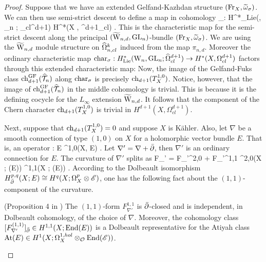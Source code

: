 \documentclass[10pt]{amsart}
\begin{document}
\begin{proof}
Suppose that we have an extended Gelfand-Kazhdan structure $({\rm Fr}_X, \widetilde{\omega}_\sigma)$.
We can then use semi-strict descent to define a map in cohomology
\ben
{}_\sigma : H^*_{\rm Lie}(\TVectd, \GL_n ; \hOmega_{cl}^{d+1}) \to H^*(X , \Omega^{d+1}_{cl}) .
\een
This is the characteristic map for the semi-strict descent along the principal $(\widetilde{\rm W}_{n,d},{\rm GL}_n)$-bundle $({\rm Fr}_X , \widetilde{\omega}_\sigma)$.
We are using the $\widetilde{\rm W}_{n,d}$ module structure on $\widehat{\Omega}^k_{n,cl}$ induced from the map $\pi_{n,d}$. 
Moreover the ordinary characteristic map ${\rm char}_\sigma : H^*_{\rm Lie}({{\rm W}_n}, {\rm GL}_n ; \widehat{\Omega}_{cl}^{d+1}) \to H^*(X , \Omega^{d+1}_{cl})$ factors through this extended characteristic map:
\ben
{}
\een
Now, the image of the Gelfand-Fuks class ${\rm ch}_{d+1}^{{\rm GF}} (\widehat{\mathcal T}_n)$ along ${\rm char}_\sigma$ is precisely ${\rm ch}_{d+1}(T_X^{1,0})$. 
Notice, however, that the image of ${\rm ch}_{d+1}^{\rm GF}(\widehat{\mathcal T}_n)$ in the middle cohomology is trivial.
This is because it is the defining cocycle for the $L_\infty$ extension $\widetilde{\rm W}_{n,d}$. 
It follows that the component of the Chern character ${\rm ch}_{d+1}(T_X^{1,0})$ is trivial in $H^{d+1}(X, \Omega^{d+1}_{cl})$. 

Next, suppose that ${\rm ch}_{d+1}(T_X^{1,0}) = 0$ and suppose $X$ is K\"ahler.
Also, let $\nabla$ be a smooth connection of type $(1,0)$ on $X$ for a
holomorphic vector bundle $E$. 
That is, an operator
\ben
\nabla : E \to \Omega^{1,0}(X, E) .
\een
Let $\nabla ' = \nabla + \Bar{\partial}$, then $\nabla'$ is an ordinary
connection for $E$. The curvature of $\nabla '$ splits as
\ben
F_{\nabla'} = F_{\nabla '}^{2,0} + F_{\nabla '}^{1,1} \in \Omega^{2,0}(X
; \End(E)) \oplus \Omega^{1,1}(X ; \End(E)) .
\een 
According to the Dolbeault isomorphism 
$H^{p,q}_{\Bar{\partial}} (X ; E) \cong H^q(X ;  \Omega^p_X \otimes \mathscr E)$, 
one has the following fact about the $(1,1)$-component of the curvature. 

\begin{prop} (Proposition 4 in \cite{atiyah})
The $(1,1)$-form $F_{\nabla'}^{1,1}$ is $\Bar{\partial}$-closed  and is independent, in Dolbeault cohomology, of the choice of $\nabla$. 
Moreover, the cohomology class $[F_{\nabla'}^{(1,1)}]_{\Bar{\partial}} \in H^{1,1}(X ; {\rm End}(E))$ is a Dolbeault representative for the Atiyah class ${\rm At}(E) \in H^1(X ; \Omega^{1,hol}_X \otimes_{\mathcal O} {\rm End}(\mathscr E))$.
\end{prop}


\end{proof}
\end{document}
